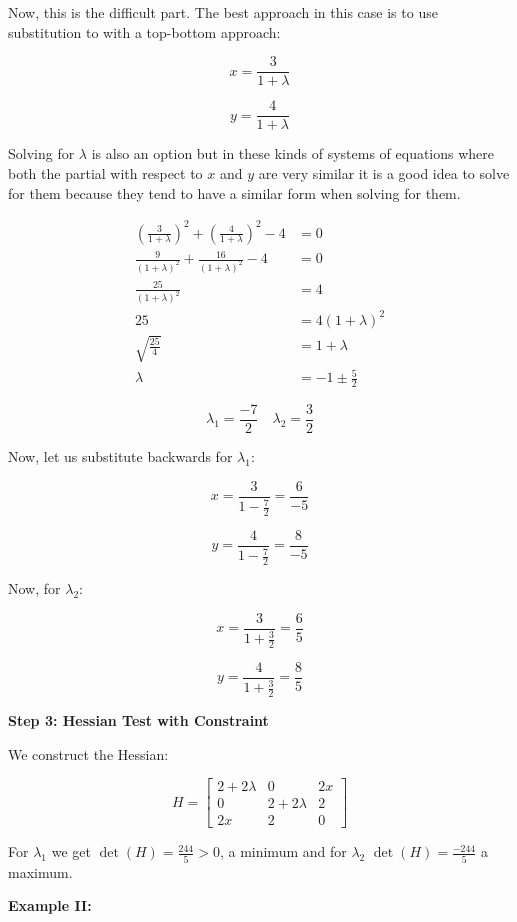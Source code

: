 Now, this is the difficult part. The best approach in this case is to use substitution to 
with a top-bottom approach:

\[
    x = \frac{3}{1 + \lambda}
\]

\[
    y = \frac{4}{1 + \lambda}
\]

Solving for \(\lambda\) is also an option but in these kinds of systems of equations where 
both the partial with respect to \(x\) and \(y\) are very similar it is a good idea to solve for them 
because they tend to have a similar form when solving for them.

\begin{align*}
    \left(\frac{3}{1 + \lambda}\right)^2 + \left(\frac{4}{1 + \lambda}\right)^2 - 4 &= 0\\
    \frac{9}{(1 + \lambda)^2} + \frac{16}{(1 + \lambda)^2} - 4 &= 0\\
    \frac{25}{(1 + \lambda)^2} &= 4 \\
    25 &= 4 (1 + \lambda)^2 \\
    \sqrt{\frac{25}{4}} &= 1 + \lambda \\
    \lambda &= -1 \pm \frac{5}{2}
\end{align*}

\[
    \lambda_1 = \frac{-7}{2} \quad \lambda_2 = \frac{3}{2}
\]

Now, let us substitute backwards for \(\lambda_1\):

\[
    x = \frac{3}{1 - \frac{7}{2}} = \frac{6}{-5}
\]

\[
    y = \frac{4}{1 - \frac{7}{2}} = \frac{8}{-5}
\]

Now,  for \(\lambda_2\):

\[
    x = \frac{3}{1 + \frac{3}{2}} = \frac{6}{5}
\]

\[
    y = \frac{4}{1 + \frac{3}{2}} = \frac{8}{5}
\]

\textbf{Step 3: Hessian Test with Constraint}

We construct the Hessian:

\[
    H = \begin{bmatrix}
    2 + 2\lambda & 0 & 2x \\
    0 & 2 + 2\lambda & 2 \\
    2x & 2 & 0
    \end{bmatrix}
\]

For \(\lambda_1\) we get \( \det(H) =  \frac{244}{5} > 0 \), a minimum 
and for \(\lambda_2\) \(\det(H) = \frac{-244}{5}\) a maximum.

\textbf{Example II:}

